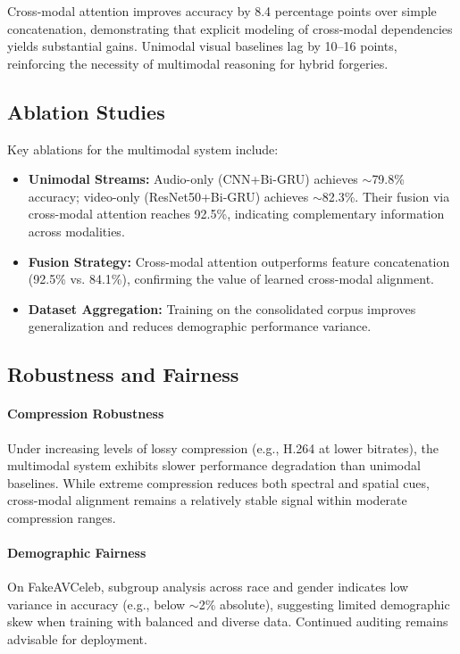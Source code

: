Cross-modal attention improves accuracy by 8.4 percentage points over simple concatenation, demonstrating that explicit modeling of cross-modal dependencies yields substantial gains. Unimodal visual baselines lag by 10--16 points, reinforcing the necessity of multimodal reasoning for hybrid forgeries.

\subsection{Ablation Studies}
Key ablations for the multimodal system include:
\begin{itemize}
    \item \textbf{Unimodal Streams:} Audio-only (CNN+Bi-GRU) achieves $\sim$79.8\% accuracy; video-only (ResNet50+Bi-GRU) achieves $\sim$82.3\%. Their fusion via cross-modal attention reaches 92.5\%, indicating complementary information across modalities.
    \item \textbf{Fusion Strategy:} Cross-modal attention outperforms feature concatenation (92.5\% vs. 84.1\%), confirming the value of learned cross-modal alignment.
    \item \textbf{Dataset Aggregation:} Training on the consolidated corpus improves generalization and reduces demographic performance variance.
\end{itemize}

\subsection{Robustness and Fairness}
\paragraph{Compression Robustness}
Under increasing levels of lossy compression (e.g., H.264 at lower bitrates), the multimodal system exhibits slower performance degradation than unimodal baselines. While extreme compression reduces both spectral and spatial cues, cross-modal alignment remains a relatively stable signal within moderate compression ranges.

\paragraph{Demographic Fairness}
On FakeAVCeleb, subgroup analysis across race and gender indicates low variance in accuracy (e.g., below $\sim$2\% absolute), suggesting limited demographic skew when training with balanced and diverse data. Continued auditing remains advisable for deployment.

